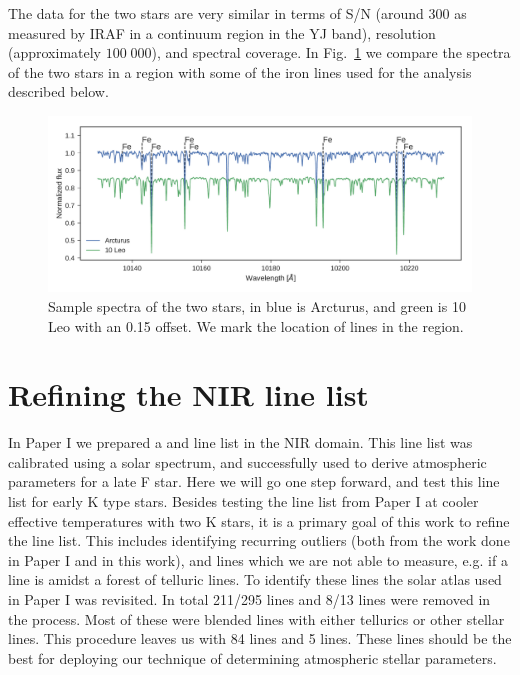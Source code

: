 \documentclass{aa}
\begin{document}
The data for the two stars are very similar in terms of S/N (around 300 as
measured by IRAF in a continuum region in the YJ band), resolution
(approximately $100\;000$), and spectral coverage. In Fig.~\ref{fig:both} we
compare the spectra of the two stars in a region with some of the iron lines
used for the analysis described below.

\begin{figure}[htpb!]
    \centering
    \includegraphics[width=1.0\linewidth]{figures/bothspectra.pdf}
    \caption{Sample spectra of the two stars, in blue is Arcturus, and green is
             10 Leo with an 0.15 offset. We mark the location of 
             lines in the region.}
    \label{fig:both}
\end{figure}





\section{Refining the NIR line list}
\label{sec:refining_the_line_list}

In Paper I we prepared a  and  line list in the NIR
domain. This line list was calibrated using a solar spectrum, and successfully
used to derive atmospheric parameters for a late F star. Here we will go one
step forward, and test this line list for early K type stars. Besides testing
the line list from Paper I at cooler effective temperatures with two K stars, it
is a primary goal of this work to refine the line list. This includes
identifying recurring outliers (both from the work done in Paper I and in this
work), and lines which we are not able to measure, e.g. if a line is amidst a
forest of telluric lines. To identify these lines the solar atlas used in Paper
I was revisited. In total 211/295  lines and 8/13  lines
were removed in the process. Most of these were blended lines with either
tellurics or other stellar lines. This procedure leaves us with 84 
lines and 5  lines. These lines should be the best for deploying our
technique of determining atmospheric stellar parameters.
\end{document}
